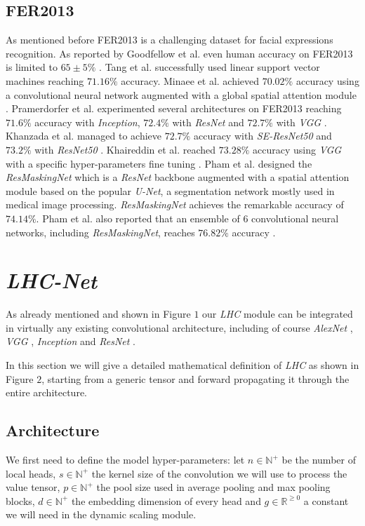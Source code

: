 \documentclass[fleqn,10pt]{SelfArx}
\begin{document}
 






\subsection{FER2013}
As mentioned before FER2013 is a challenging dataset for facial expressions recognition. 
As reported by Goodfellow et al. even human accuracy on FER2013 is limited to $65\pm5\%$ \cite{FER2013}. Tang et al. \cite{FER2013} successfully used linear support vector machines reaching $71.16\%$ accuracy.
Minaee et al. achieved $70.02\%$ accuracy using a convolutional neural network augmented with a global spatial attention module \cite{minaee2021deep}. Pramerdorfer et al. experimented several architectures on FER2013 reaching $71.6\%$ accuracy with \textit{Inception}, $72.4\%$ with \textit{ResNet} and $72.7\%$ with \textit{VGG} \cite{pramerdorfer2016facial}. Khanzada et al. managed to achieve $72.7\%$ accuracy with \textit{SE-ResNet50} and $73.2\%$ with \textit{ResNet50} \cite{khanzada2020facial}. Khaireddin et al. reached $73.28\%$ accuracy using \textit{VGG} with a specific hyper-parameters fine tuning \cite{khaireddin2021facial}.
Pham et al. designed the \textit{ResMaskingNet} which is a \textit{ResNet} backbone augmented with a spatial attention module based on the popular \textit{U-Net}, a segmentation network mostly used in medical image processing. \textit{ResMaskingNet} achieves the remarkable accuracy of $74.14\%$. Pham et al. also reported that an ensemble of $6$ convolutional neural networks, including \textit{ResMaskingNet}, reaches $76.82\%$ accuracy \cite{resmaskingnet}.

\section{\textit{LHC-Net}}
As already mentioned and shown in Figure $1$ our \textit{LHC} module can be integrated in virtually any existing convolutional architecture, including of course \textit{AlexNet} \cite{krizhevsky2012imagenet}, \textit{VGG} \cite{vgg}, \textit{Inception} \cite{inception} and \textit{ResNet} \cite{resnet}. 

In this section we will give a detailed mathematical definition of \textit{LHC} as shown in Figure $2$, starting from a generic tensor and forward propagating it through the entire architecture.
\subsection{Architecture}
We first need to define the model hyper-parameters: let $n \in \mathbb{N}^{+}$ be the number of local heads, $s \in \mathbb{N}^{+}$ the kernel size of the convolution we will use to process the value tensor, $p \in \mathbb{N}^{+}$ the pool size used in average pooling and max pooling blocks, $d \in \mathbb{N}^{+}$ the embedding dimension of every head and $g \in \mathbb{R}^{\geq 0}$ a constant we will need in the dynamic scaling module.
\end{document}
